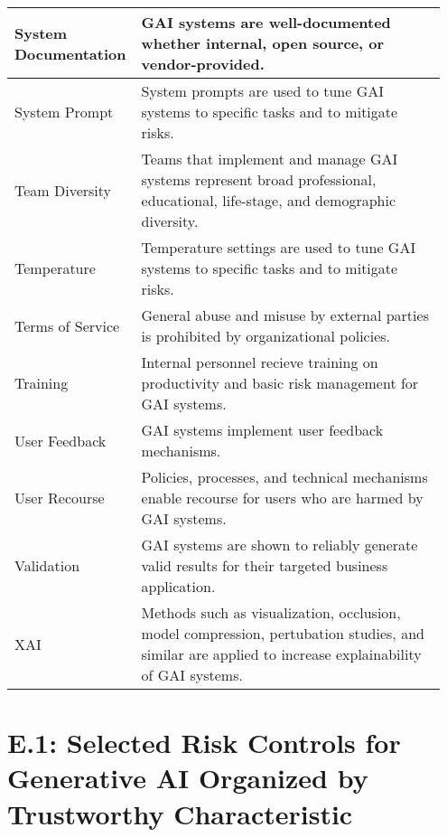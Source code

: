 \documentclass[fleqn]{article}
\begin{document}
\begin{table}[H]
\begin{tabular}{|m{0.25\linewidth} |m{0.70\linewidth} |}
		System Documentation & GAI systems are well-documented whether internal, open source, or vendor-provided.  \\ \hline
		System Prompt  & System prompts are used to tune GAI systems to specific tasks and to mitigate risks.  \\ \hline
		Team Diversity & Teams that implement and manage GAI systems represent broad professional, educational, life-stage, and demographic diversity.  \\ \hline
		Temperature & Temperature settings are used to tune GAI systems to specific tasks and to mitigate risks.  \\ \hline
		Terms of Service & General abuse and misuse by external parties is prohibited by organizational policies.  \\ \hline
		Training  & Internal personnel recieve training on productivity and basic risk management for GAI systems.  \\ \hline
		User Feedback & GAI systems implement user feedback mechanisms.   \\ \hline
		User Recourse & Policies, processes, and technical mechanisms enable recourse for users who are harmed by GAI systems.  \\ \hline
		Validation & GAI systems are shown to reliably generate valid results for their targeted business application. \\ \hline
		XAI & Methods such as visualization, occlusion, model compression, pertubation studies, and similar are applied to increase explainability of GAI systems.  \\ \hline
	\end{tabular}
\end{table}

\pagebreak

\section*{E.1: Selected Risk Controls for Generative AI Organized by Trustworthy Characteristic}\label{sec:appndxe1}
\end{document}
